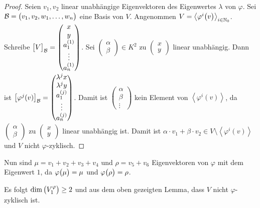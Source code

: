 \documentclass{scrreprt}
\begin{document}
\begin{enumerate}[(i)]
  \noindent
  \begin{proof}
  Seien $v_1, v_2$ linear unabhängige Eigenvektoren des
  Eigenwertes $\lambda$ von $\varphi$.
  Sei $\mathcal{B} = \qty\big(v_1, v_2, w_1, \ldots, w_n)$ eine Basis von $V$.
  Angenommen $V = \left\langle
    \varphi^i\qty\big(v)
  \right\rangle_{i \in \mathbb{N}_0}$.
  Schreibe $\qty\big[V]_{\mathcal{B}} = \begin{pmatrix}
    x \\
    y \\
    a_1^{(1)} \\
    \vdots \\
    a_n^{(1)}
  \end{pmatrix}$.
  Sei $\begin{pmatrix}\alpha\\\beta\end{pmatrix} \in K^2$ zu
  $\begin{pmatrix}x\\y\end{pmatrix}$ linear unabhängig.
  Dann ist $\qty\big[\varphi^j(v)]_{\mathcal{B}} = \begin{pmatrix}
    \lambda^j x \\
    \lambda^j y \\
    a_1^{(j)} \\
    \vdots \\
    a_n^{(j)}
  \end{pmatrix}$.
  Damit ist $\begin{pmatrix}\alpha\\\beta\\\vdots\end{pmatrix}$ kein Element
  von $\left\langle \varphi^i(v) \right\rangle$, da
  $\begin{pmatrix}\alpha\\\beta\end{pmatrix}$ zu
  $\begin{pmatrix}x\\y\end{pmatrix}$ linear unabhängig ist.
  Damit ist $\alpha \cdot v_1 + \beta \cdot v_2 \in V \setminus
  \left\langle \varphi^i(v) \right\rangle$ und $V$ nicht $\varphi$-zyklisch.
  \end{proof}

  Nun sind $\mu = v_1 + v_2 + v_3 + v_4$ und $\rho = v_5 + v_6$
  Eigenvektoren von $\varphi$ mit dem Eigenwert $1$, da
  $\varphi\qty\big(\mu) = \mu$ und $\varphi\qty\big(\rho) = \rho$.

  Es folgt $\dim\qty\big(V_{1}^{\varphi}) \geq 2$ und aus dem oben gezeigten
  Lemma, dass $V$ nicht $\varphi$-zyklisch ist.


\end{enumerate}
\end{document}
